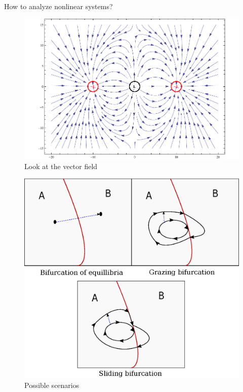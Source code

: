 \documentclass[xcolor=x11names,compress]{beamer}
\renewcommand{\(}{\begin{columns}}
\renewcommand{\)}{\end{columns}}
\newcommand{\<}[1]{\begin{column}{#1}}
\renewcommand{\>}{\end{column}}
\begin{document}
\begin{frame}{How to analyze nonlinear systems?}
\begin{figure}
\caption{Look at the vector field}
\begin{center}
\includegraphics[width=0.9\columnwidth]{vfield}
\end{center}
\end{figure}


\end{frame}

\begin{frame}
\begin{figure}
\caption{Possible scenarios}
\begin{center}
\includegraphics[height=0.84\textheight]{../2011-09-11/c-bifs}
\end{center}
\end{figure}

\end{frame}
\end{document}
